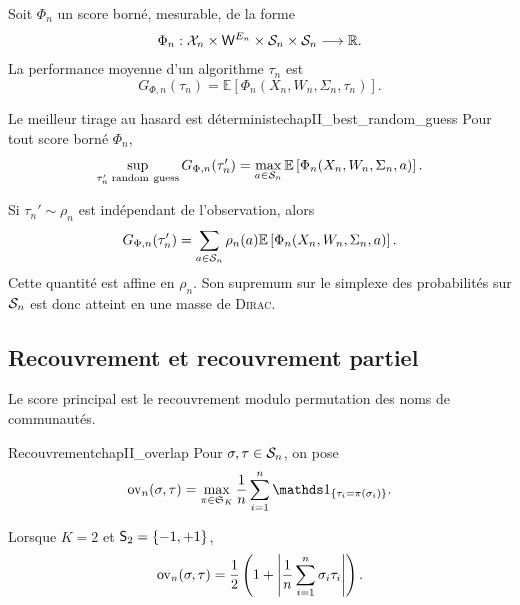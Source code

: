 Soit $\Phi_n$ un score borné, mesurable, de la forme
\[
    \Phi_n:\mathcal X_n\times \mathsf W^{E_n}\times\mathcal S_n\times\mathcal S_n\longrightarrow\mathbb R.
\]
La performance moyenne d'un algorithme $\tau_n$ est
\begin{equation}
    G_{\Phi,n}(\tau_n)
    =
    \mathbb E\left[\Phi_n(X_n,W_n,\Sigma_n,\tau_n)\right].
    \label{eq:chapII_score_general}
\end{equation}

\begin{Fait}{Le meilleur tirage au hasard est déterministe}{chapII_best_random_guess}
Pour tout score borné $\Phi_n$,
\begin{equation}
    \sup_{\tau_n'\;\mathrm{random\ guess}}G_{\Phi,n}(\tau_n')
    =
    \max_{a\in\Conf_n}
    \mathbb E\left[\Phi_n(X_n,W_n,\Sigma_n,a)\right].
    \label{eq:chapII_best_guess_deterministe}
\end{equation}
\end{Fait}

\begin{Preuve}
Si $\tau_n'\sim\rho_n$ est indépendant de l'observation, alors
\[
    G_{\Phi,n}(\tau_n')
    =
    \sum_{a\in\mathcal S_n}\rho_n(a)
    \mathbb E\left[\Phi_n(X_n,W_n,\Sigma_n,a)\right].
\]
Cette quantité est affine en $\rho_n$. Son supremum sur le simplexe des probabilités sur $\mathcal S_n$ est donc atteint en une masse de \textsc{Dirac}.
\end{Preuve}

\subsection{Recouvrement et recouvrement partiel}

Le score principal est le recouvrement modulo permutation des noms de communautés.

\begin{Definition}{Recouvrement}{chapII_overlap}
Pour $\sigma,\tau\in\mathcal S_n$, on pose
\begin{equation}
    \ov_n(\sigma,\tau)
    =
    \max_{\pi\in\mathfrak S_K}
    \frac1n\sum_{i=1}^n \ind{\tau_i=\pi(\sigma_i)}.
    \label{eq:chapII_overlap}
\end{equation}
\end{Definition}

Lorsque $K=2$ et $\mathsf S_2=\{-1,+1\}$,
\begin{equation}
    \operatorname{ov}_n(\sigma,\tau)
    =
    \frac12\left(1+\left|\frac1n\sum_{i=1}^n\sigma_i\tau_i\right|\right).
    \label{eq:chapII_overlap_spins}
\end{equation}

